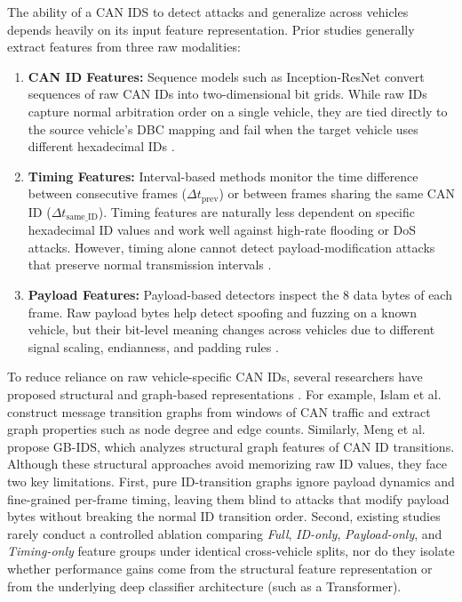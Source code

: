 \documentclass[12pt, a4paper, reqno, oneside]{book}
\begin{document}
The ability of a CAN IDS to detect attacks and generalize across vehicles depends heavily on its input feature representation. Prior studies generally extract features from three raw modalities:
\begin{enumerate}
    \item \textbf{CAN ID Features:} Sequence models such as Inception-ResNet \cite{song2020invehicle} convert sequences of raw CAN IDs into two-dimensional bit grids. While raw IDs capture normal arbitration order on a single vehicle, they are tied directly to the source vehicle's DBC mapping and fail when the target vehicle uses different hexadecimal IDs \cite{lampe2024curated}.
    \item \textbf{Timing Features:} Interval-based methods \cite{lee2017otids} monitor the time difference between consecutive frames ($\Delta t_{\text{prev}}$) or between frames sharing the same CAN ID ($\Delta t_{\text{same\_ID}}$). Timing features are naturally less dependent on specific hexadecimal ID values and work well against high-rate flooding or DoS attacks. However, timing alone cannot detect payload-modification attacks that preserve normal transmission intervals \cite{dupont2019automotive}.
    \item \textbf{Payload Features:} Payload-based detectors inspect the 8 data bytes of each frame. Raw payload bytes help detect spoofing and fuzzing on a known vehicle, but their bit-level meaning changes across vehicles due to different signal scaling, endianness, and padding rules \cite{lampe2024curated}.
\end{enumerate}

To reduce reliance on raw vehicle-specific CAN IDs, several researchers have proposed structural and graph-based representations \cite{islam2020graph, meng2023gbids}. For example, Islam et al. \cite{islam2020graph} construct message transition graphs from windows of CAN traffic and extract graph properties such as node degree and edge counts. Similarly, Meng et al. \cite{meng2023gbids} propose GB-IDS, which analyzes structural graph features of CAN ID transitions. Although these structural approaches avoid memorizing raw ID values, they face two key limitations. First, pure ID-transition graphs ignore payload dynamics and fine-grained per-frame timing, leaving them blind to attacks that modify payload bytes without breaking the normal ID transition order. Second, existing studies rarely conduct a controlled ablation comparing \textit{Full}, \textit{ID-only}, \textit{Payload-only}, and \textit{Timing-only} feature groups under identical cross-vehicle splits, nor do they isolate whether performance gains come from the structural feature representation or from the underlying deep classifier architecture (such as a Transformer).
\end{document}
